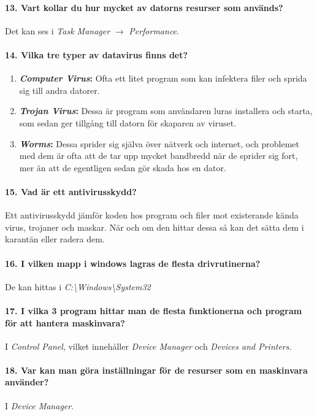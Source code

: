 \paragraph{13. Vart kollar du hur mycket av datorns resurser som används?}
Det kan ses i \textit{Task Manager} $\rightarrow$ \textit{Performance}.

\paragraph{14. Vilka tre typer av datavirus finns det?}
\begin{enumerate}
	\item \textbf{\textit{Computer Virus}:} Ofta ett litet program som kan infektera filer och sprida sig till andra datorer.
	\item \textbf{\textit{Trojan Virus}:} Dessa är program som användaren luras installera och starta, som sedan ger tillgång till datorn för skaparen av viruset.
	\item \textbf{\textit{Worms}:} Dessa sprider sig själva över nätverk och internet, och problemet med dem är ofta att de tar upp mycket bandbredd när de sprider sig fort, mer än att de egentligen sedan gör skada hos en dator.
\end{enumerate}

\paragraph{15. Vad är ett antivirusskydd?}
Ett antivirusskydd jämför koden hos program och filer mot existerande kända virus, trojaner och maskar. När och om den hittar dessa så kan det sätta dem i karantän eller radera dem.

\paragraph{16. I vilken mapp i windows lagras de flesta drivrutinerna?} De kan hittas i \textit{C:\textbackslash Windows\textbackslash System32}

\paragraph{17. I vilka 3 program hittar man de flesta funktionerna och program för att hantera maskinvara?}
I \textit{Control Panel}, vilket innehåller \textit{Device Manager} och \textit{Devices and Printers}.

\paragraph{18. Var kan man göra inställningar för de resurser som en maskinvara använder?} I \textit{Device Manager}.

